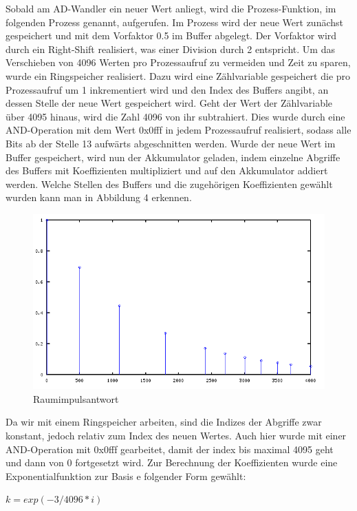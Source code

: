 \documentclass[a4paper,12pt,fontsize=12,DIV=12]{scrartcl}
\begin{document}
Sobald am AD-Wandler ein neuer Wert anliegt, wird die Prozess-Funktion, im folgenden Prozess genannt, aufgerufen. Im Prozess wird der neue Wert zunächst gespeichert und mit dem Vorfaktor 0.5 im Buffer abgelegt. Der Vorfaktor wird durch ein Right-Shift realisiert, was einer Division durch 2 entspricht. 
Um das Verschieben von 4096 Werten pro Prozessaufruf zu vermeiden und Zeit zu sparen, wurde ein Ringspeicher realisiert. Dazu wird eine Zählvariable gespeichert die pro Prozessaufruf um 1 inkrementiert wird und den Index des Buffers angibt, an dessen Stelle der neue Wert gespeichert wird. Geht der Wert der Zählvariable über 4095 hinaus, wird die Zahl 4096 von ihr subtrahiert. Dies wurde durch eine AND-Operation mit dem Wert 0x0fff in jedem Prozessaufruf realisiert, sodass alle Bits ab der Stelle 13  aufwärts abgeschnitten werden.
Wurde der neue Wert im Buffer gespeichert, wird nun der Akkumulator geladen, indem einzelne Abgriffe des Buffers mit Koeffizienten multipliziert und auf den Akkumulator addiert werden. Welche Stellen des Buffers und die zugehörigen Koeffizienten gewählt wurden kann man in Abbildung 4 erkennen.
\begin{figure}[h]
	\includegraphics[scale=0.5]{Bilder/signalabgriffe.png}
	\caption{Raumimpulsantwort}
	\label{labelname}
\end{figure}
Da wir mit einem Ringspeicher arbeiten, sind die Indizes der Abgriffe zwar konstant, jedoch relativ zum Index des neuen Wertes. Auch hier wurde mit einer AND-Operation mit 0x0fff gearbeitet, damit der index bis maximal 4095 geht und dann von 0 fortgesetzt wird.
Zur Berechnung der Koeffizienten wurde eine Exponentialfunktion zur Basis e folgender Form gewählt:

$k=exp(-3/4096*i)$
 
\end{document}

